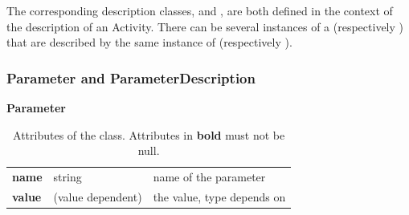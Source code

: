 The corresponding description classes,  and  , are both defined in the context of the description of an Activity. 
There can be several instances of a  (respectively ) that are described by the same instance of   (respectively ).


\subsubsection{Parameter and ParameterDescription}
\label{sec:parameterandD}


\begin{table}[ht]
\small
{}\textwidth
 \textbf{\normalsize Parameter}\vspace{0.25em}\\
 \begin{tabulary}{1.0\textwidth}{llL}
 \toprule
  &    & \\
 \midrule
\textbf{name} &  string & name of the parameter \\
\textbf{value} & (value dependent)  &  the value, type depends on  \\
\bottomrule
\end{tabulary}
\caption[Attributes of the  class]{Attributes of the  class. Attributes in \textbf{bold} must not be null.}
\label{tab:param}
\end{table}

